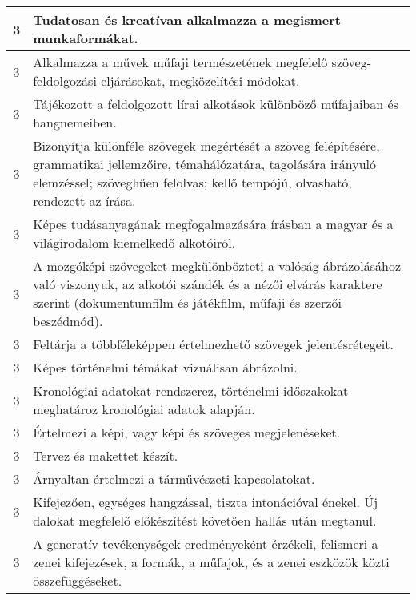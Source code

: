 \begin{longtable}{c | p{12cm} }
                                
                                          3 &  Tudatosan és kreatívan alkalmazza a megismert munkaformákat. \\ \hline
                                          3 &  Alkalmazza a művek műfaji természetének megfelelő szöveg-feldolgozási eljárásokat, megközelítési módokat. \\ \hline
                                          3 &  Tájékozott a feldolgozott lírai alkotások különböző műfajaiban és hangnemeiben. \\ \hline
                                          3 &  Bizonyítja különféle szövegek megértését a szöveg felépítésére, grammatikai jellemzőire, témahálózatára, tagolására irányuló elemzéssel; szöveghűen felolvas; kellő tempójú, olvasható, rendezett az írása.  \\ \hline
                                          3 &  Képes tudásanyagának megfogalmazására írásban a magyar és a világirodalom kiemelkedő alkotóiról. \\ \hline
                                          3 &  A mozgóképi szövegeket megkülönbözteti a valóság ábrázolásához való viszonyuk, az alkotói szándék és a nézői elvárás karaktere szerint (dokumentumfilm és játékfilm, műfaji és szerzői beszédmód). \\ \hline
                                          3 &  Feltárja a többféleképpen értelmezhető szövegek jelentésrétegeit. \\ \hline
                                          3 &  Képes történelmi témákat vizuálisan ábrázolni. \\ \hline
                                          3 &  Kronológiai adatokat rendszerez, történelmi időszakokat meghatároz kronológiai adatok alapján. \\ \hline
                                          3 &  Értelmezi a képi, vagy képi és szöveges megjelenéseket. \\ \hline
                                          3 &  Tervez és makettet készít. \\ \hline
                                          3 &  Árnyaltan értelmezi a tárművészeti kapcsolatokat. \\ \hline
                                          3 &  Kifejezően, egységes hangzással, tiszta intonációval énekel. Új dalokat megfelelő előkészítést követően hallás után megtanul. \\ \hline
                                          3 &  A generatív tevékenységek eredményeként érzékeli, felismeri a zenei kifejezések, a formák, a műfajok, és a zenei eszközök közti összefüggéseket. \\ \hline
                                      

\end{longtable}
